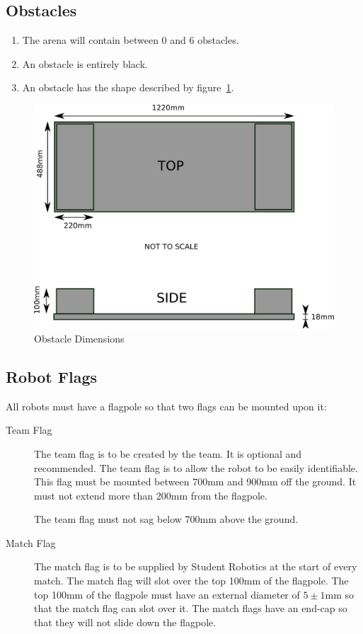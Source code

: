 \subsection{Obstacles}
\begin{enumerate}
\item The arena will contain between 0 and 6 obstacles.
\item An obstacle is entirely black.
\item An obstacle has the shape described by figure~\ref{fig:obstacle}.
\end{enumerate}

\begin{figure}
\begin{center}
\includegraphics[keepaspectratio, scale =1]{./images/obstacle.png}
\caption{\label{fig:obstacle}Obstacle Dimensions}
\end{center}
\end{figure}

\subsection{Robot Flags}
\label{sec:flags}
All robots must have a flagpole so that two flags can be mounted upon it:
\begin{description}
\item[Team Flag] The team flag is to be created by the team.  It is optional and recommended.  The team flag is to allow the robot to be easily identifiable.  This flag must be mounted between 700mm and 900mm off the ground.  It must not extend more than 200mm from the flagpole.

The team flag must not sag below 700mm above the ground.
\item[Match Flag] The match flag is to be supplied by Student Robotics at the start of every match.  The match flag will slot over the top 100mm of the flagpole.  The top 100mm of the flagpole must have an external diameter of $5\pm1$mm so that the match flag can slot over it.  The match flags have an end-cap so that they will not slide down the flagpole.
\end{description}

